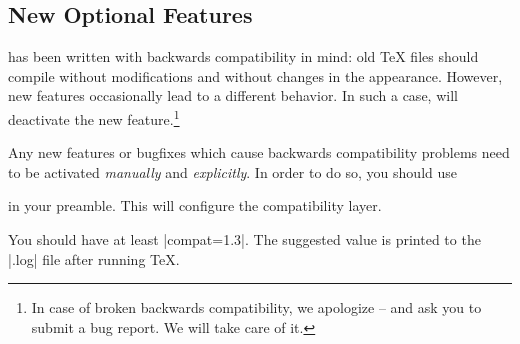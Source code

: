 \subsection{New Optional Features}

\PGFPlots{} has been written with backwards compatibility in mind: old \TeX{}
files should compile without modifications and without changes in the
appearance. However, new features occasionally lead to a different behavior. In
such a case, \PGFPlots{} will deactivate the new feature.\footnote{In case of
broken backwards compatibility, we apologize -- and ask you to submit a bug
report. We will take care of it.}

Any new features or bugfixes which cause backwards compatibility problems need
to be activated \emph{manually} and \emph{explicitly}. In order to do so, you
should use
%


%
\noindent in your preamble. This will configure the compatibility layer.

You should have at least |compat=1.3|. The suggested value is printed to the
|.log| file after running \TeX{}.

